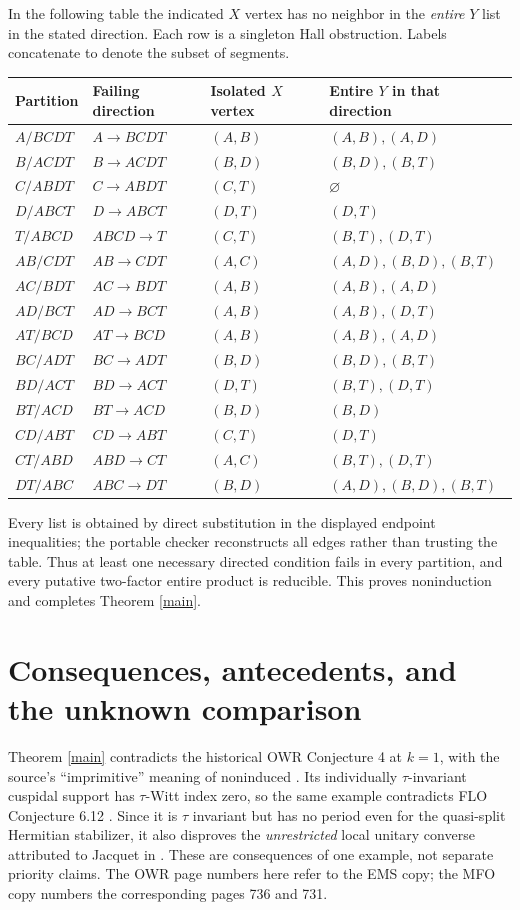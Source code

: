 \documentclass[11pt]{article}
\begin{document}
In the following table the indicated $X$ vertex has no neighbor in the \emph{entire} $Y$ list in the stated direction. Each row is a singleton Hall obstruction. Labels concatenate to denote the subset of segments.
\begin{center}\small
\begin{tabular}{llll}
\toprule
Partition & Failing direction & Isolated $X$ vertex & Entire $Y$ in that direction\\
\midrule
$A/BCDT$ & $A\to BCDT$ & $(A,B)$ & $(A,B),(A,D)$\\
$B/ACDT$ & $B\to ACDT$ & $(B,D)$ & $(B,D),(B,T)$\\
$C/ABDT$ & $C\to ABDT$ & $(C,T)$ & $\varnothing$\\
$D/ABCT$ & $D\to ABCT$ & $(D,T)$ & $(D,T)$\\
$T/ABCD$ & $ABCD\to T$ & $(C,T)$ & $(B,T),(D,T)$\\
$AB/CDT$ & $AB\to CDT$ & $(A,C)$ & $(A,D),(B,D),(B,T)$\\
$AC/BDT$ & $AC\to BDT$ & $(A,B)$ & $(A,B),(A,D)$\\
$AD/BCT$ & $AD\to BCT$ & $(A,B)$ & $(A,B),(D,T)$\\
$AT/BCD$ & $AT\to BCD$ & $(A,B)$ & $(A,B),(A,D)$\\
$BC/ADT$ & $BC\to ADT$ & $(B,D)$ & $(B,D),(B,T)$\\
$BD/ACT$ & $BD\to ACT$ & $(D,T)$ & $(B,T),(D,T)$\\
$BT/ACD$ & $BT\to ACD$ & $(B,D)$ & $(B,D)$\\
$CD/ABT$ & $CD\to ABT$ & $(C,T)$ & $(D,T)$\\
$CT/ABD$ & $ABD\to CT$ & $(A,C)$ & $(B,T),(D,T)$\\
$DT/ABC$ & $ABC\to DT$ & $(B,D)$ & $(A,D),(B,D),(B,T)$\\
\bottomrule
\end{tabular}
\end{center}
Every list is obtained by direct substitution in the displayed endpoint inequalities; the portable checker reconstructs all edges rather than trusting the table. Thus at least one necessary directed condition fails in every partition, and every putative two-factor entire product is reducible. This proves noninduction and completes Theorem \ref{main}.

\section{Consequences, antecedents, and the unknown comparison}
Theorem \ref{main} contradicts the historical OWR Conjecture 4 at $k=1$, with the source's ``imprimitive'' meaning of noninduced \cite[p.734]{OWR}. Its individually $\tau$-invariant cuspidal support has $\tau$-Witt index zero, so the same example contradicts FLO Conjecture 6.12 \cite[p.246]{FLO}. Since it is $\tau$ invariant but has no period even for the quasi-split Hermitian stabilizer, it also disproves the \emph{unrestricted} local unitary converse attributed to Jacquet in \cite[Conjecture 1, p.729]{OWR}. These are consequences of one example, not separate priority claims. The OWR page numbers here refer to the EMS copy; the MFO copy numbers the corresponding pages 736 and 731.
\end{document}
